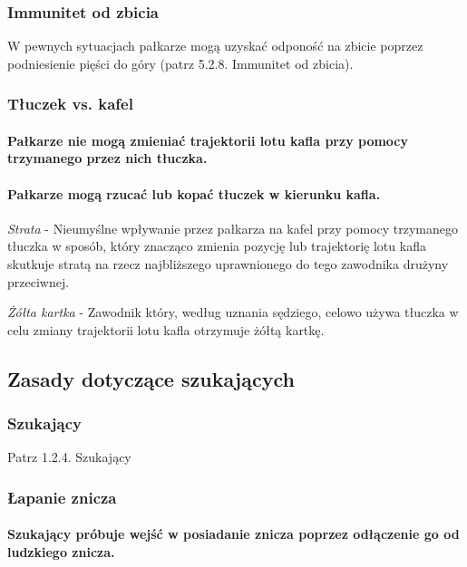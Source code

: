 \documentclass[12pt]{article}
\begin{document}
\subsubsection{Immunitet od zbicia}

W pewnych sytuacjach pałkarze mogą uzyskać odponość na zbicie poprzez
podniesienie pięści do góry (patrz 5.2.8. Immunitet od zbicia).

\subsubsection{Tłuczek vs. kafel}

\paragraph{Pałkarze nie mogą zmieniać trajektorii lotu kafla przy
pomocy trzymanego przez nich tłuczka.}

\paragraph{Pałkarze mogą rzucać lub kopać tłuczek w kierunku
kafla.}

\emph{Strata} - Nieumyślne wpływanie przez pałkarza na kafel przy pomocy
trzymanego tłuczka w sposób, który znacząco zmienia pozycję lub
trajektorię lotu kafla skutkuje stratą na rzecz najbliższego
uprawnionego do tego zawodnika drużyny przeciwnej.

\emph{Żółta kartka} - Zawodnik który, według uznania sędziego, celowo
używa tłuczka w celu zmiany trajektorii lotu kafla otrzymuje żółtą
kartkę.

\subsection{Zasady dotyczące szukających}

\subsubsection{Szukający}
Patrz 1.2.4. Szukający

\subsubsection{Łapanie znicza}

\paragraph{Szukający próbuje wejść w posiadanie znicza poprzez
odłączenie go od ludzkiego znicza.}
\end{document}
